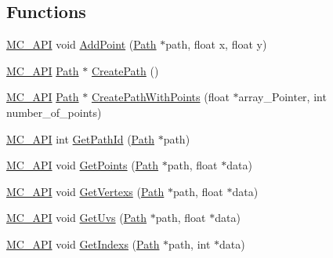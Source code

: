 \subsection*{Functions}
\begin{DoxyCompactItemize}
\item 
\mbox{\hyperlink{_mesh___creator___controller_8hpp_a529916b90fdb2765a7b955fded854b0a}{M\+C\+\_\+\+A\+PI}} void \mbox{\hyperlink{namespace_m_c_a48710ffe327fd3e394d0e3fdb689ce1a}{Add\+Point}} (\mbox{\hyperlink{class_m_c_1_1_path}{Path}} $\ast$path, float x, float y)
\item 
\mbox{\hyperlink{_mesh___creator___controller_8hpp_a529916b90fdb2765a7b955fded854b0a}{M\+C\+\_\+\+A\+PI}} \mbox{\hyperlink{class_m_c_1_1_path}{Path}} $\ast$ \mbox{\hyperlink{namespace_m_c_ac0beb59945ffd2b41606f7e78994f5f9}{Create\+Path}} ()
\item 
\mbox{\hyperlink{_mesh___creator___controller_8hpp_a529916b90fdb2765a7b955fded854b0a}{M\+C\+\_\+\+A\+PI}} \mbox{\hyperlink{class_m_c_1_1_path}{Path}} $\ast$ \mbox{\hyperlink{namespace_m_c_ae0c8fc75717231f9bde51aa37da1ea58}{Create\+Path\+With\+Points}} (float $\ast$array\+\_\+\+Pointer, int number\+\_\+of\+\_\+points)
\item 
\mbox{\hyperlink{_mesh___creator___controller_8hpp_a529916b90fdb2765a7b955fded854b0a}{M\+C\+\_\+\+A\+PI}} int \mbox{\hyperlink{namespace_m_c_a348813330bb868b5e461155b80fbde14}{Get\+Path\+Id}} (\mbox{\hyperlink{class_m_c_1_1_path}{Path}} $\ast$path)
\item 
\mbox{\hyperlink{_mesh___creator___controller_8hpp_a529916b90fdb2765a7b955fded854b0a}{M\+C\+\_\+\+A\+PI}} void \mbox{\hyperlink{namespace_m_c_a6c0e195159f00355a9fe9331d67b2b4c}{Get\+Points}} (\mbox{\hyperlink{class_m_c_1_1_path}{Path}} $\ast$path, float $\ast$data)
\item 
\mbox{\hyperlink{_mesh___creator___controller_8hpp_a529916b90fdb2765a7b955fded854b0a}{M\+C\+\_\+\+A\+PI}} void \mbox{\hyperlink{namespace_m_c_a15bafddf753bfddf2799228e129a731b}{Get\+Vertexs}} (\mbox{\hyperlink{class_m_c_1_1_path}{Path}} $\ast$path, float $\ast$data)
\item 
\mbox{\hyperlink{_mesh___creator___controller_8hpp_a529916b90fdb2765a7b955fded854b0a}{M\+C\+\_\+\+A\+PI}} void \mbox{\hyperlink{namespace_m_c_a539fd0bf94fb0e35eecbb219670904a5}{Get\+Uvs}} (\mbox{\hyperlink{class_m_c_1_1_path}{Path}} $\ast$path, float $\ast$data)
\item 
\mbox{\hyperlink{_mesh___creator___controller_8hpp_a529916b90fdb2765a7b955fded854b0a}{M\+C\+\_\+\+A\+PI}} void \mbox{\hyperlink{namespace_m_c_ac9a93e4a54c5d89d0e21f40dcb67a8ef}{Get\+Indexs}} (\mbox{\hyperlink{class_m_c_1_1_path}{Path}} $\ast$path, int $\ast$data)

\end{DoxyCompactItemize}
